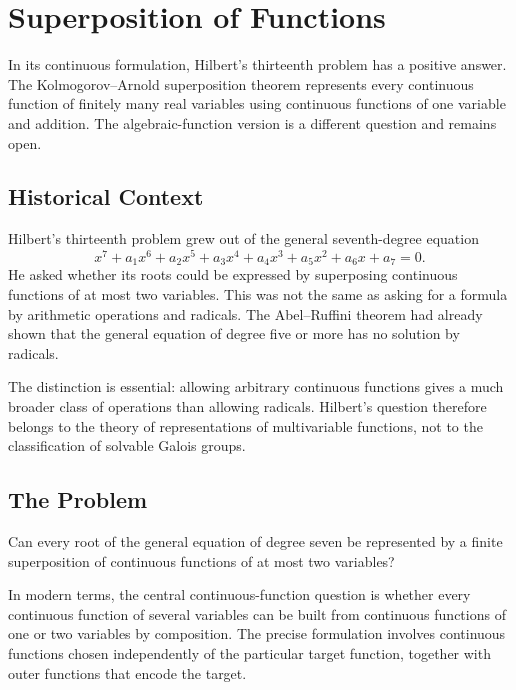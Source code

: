 
\chapter{Superposition of Functions}

\begin{solvedbox}
In its continuous formulation, Hilbert's thirteenth problem has a positive answer. The Kolmogorov--Arnold superposition theorem represents every continuous function of finitely many real variables using continuous functions of one variable and addition. The algebraic-function version is a different question and remains open.
\end{solvedbox}

\section{Historical Context}

Hilbert's thirteenth problem grew out of the general seventh-degree equation
\[
 x^7+a_1x^6+a_2x^5+a_3x^4+a_4x^3+a_5x^2+a_6x+a_7=0.
\]
He asked whether its roots could be expressed by superposing continuous functions of at most two variables. This was not the same as asking for a formula by arithmetic operations and radicals. The Abel--Ruffini theorem had already shown that the general equation of degree five or more has no solution by radicals.

The distinction is essential: allowing arbitrary continuous functions gives a much broader class of operations than allowing radicals. Hilbert's question therefore belongs to the theory of representations of multivariable functions, not to the classification of solvable Galois groups.

\section{The Problem}

\begin{problem_statement}
Can every root of the general equation of degree seven be represented by a finite superposition of continuous functions of at most two variables?
\end{problem_statement}

In modern terms, the central continuous-function question is whether every continuous function of several variables can be built from continuous functions of one or two variables by composition. The precise formulation involves continuous functions chosen independently of the particular target function, together with outer functions that encode the target.


